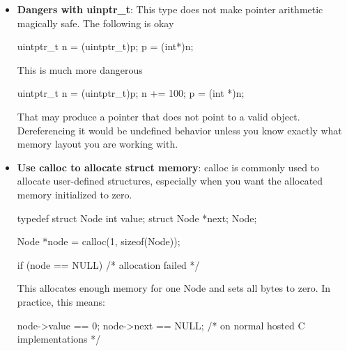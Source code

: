 \documentclass{report}
\begin{document}
\begin{itemize}
\begin{cppcode}
                    int *real_ptr = (int *)(tagged & ~(uintptr_t)FLAG);
                    int flag_set = tagged & FLAG;
                \end{cppcode}
                \bigbreak \noindent 
                This only works when you know the pointer is aligned enough that the low bit is unused.
            \item \textbf{Dangers with uinptr\_t}: This type does not make pointer arithmetic magically safe. The following is okay 
                \bigbreak \noindent 
                \begin{cppcode}
                uintptr_t n = (uintptr_t)p;
                p = (int*)n;
                \end{cppcode}
                \bigbreak \noindent 
                This is much more dangerous
                \bigbreak \noindent 
                \begin{cppcode}
                    uintptr_t n = (uintptr_t)p;
                    n += 100;
                    p = (int *)n;
                \end{cppcode}
                \bigbreak \noindent 
                That may produce a pointer that does not point to a valid object. Dereferencing it would be undefined behavior unless you know exactly what memory layout you are working with.
            \item \textbf{Use calloc to allocate struct memory}: calloc is commonly used to allocate user-defined structures, especially when you want the allocated memory initialized to zero. 
                \bigbreak \noindent 
                \begin{cppcode}
                    typedef struct Node {
                        int value;
                        struct Node *next;
                    } Node;

                    Node *node = calloc(1, sizeof(Node));

                    if (node == NULL) {
                        /* allocation failed */
                    }
                \end{cppcode}
                \bigbreak \noindent 
                This allocates enough memory for one Node and sets all bytes to zero. In practice, this means:
                \bigbreak \noindent 
                \begin{cppcode}
                    node->value == 0;
                    node->next == NULL;   /* on normal hosted C implementations */
                \end{cppcode}

        \end{itemize}
\end{document}
